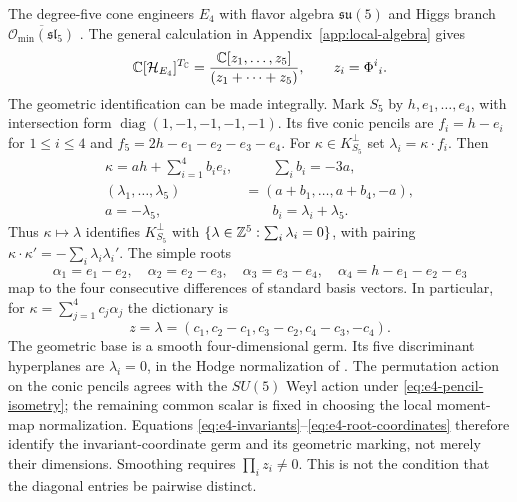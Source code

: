 The degree-five cone engineers $E_4$ with flavor algebra
$\mathfrak{su}(5)$ and Higgs branch
$\overline{\mathcal O_{\min}(\mathfrak{sl}_5)}$
\cite[Section~2.5]{Cremonesi:2015lsa}. The general calculation in
Appendix~\ref{app:local-algebra} gives
\begin{equation}
 \mathbb C[\mathcal H_{E_4}]^{T_{\mathbb C}}
 =\frac{\mathbb C[z_1,\ldots,z_5]}{(z_1+\cdots+z_5)},\qquad z_i=\Phi^i{}_i.
 \label{eq:e4-invariants}
\end{equation}
The geometric identification can be made integrally. Mark $S_5$ by
$h,e_1,\ldots,e_4$, with intersection form $\operatorname{diag}(1,-1,-1,-1,-1)$.
Its five conic pencils are $f_i=h-e_i$ for $1\leq i\leq4$ and
$f_5=2h-e_1-e_2-e_3-e_4$. For $\kappa\in K_{S_5}^{\perp}$ set
$\lambda_i=\kappa\cdot f_i$. Then
\begin{equation}
 \begin{aligned}
 \kappa=a h+\sum_{i=1}^4b_i e_i,&\qquad \sum_i b_i=-3a,\\
 (\lambda_1,\ldots,\lambda_5)&=(a+b_1,\ldots,a+b_4,-a),\\
 a=-\lambda_5,&\qquad b_i=\lambda_i+\lambda_5.
 \end{aligned}
 \label{eq:e4-pencil-isometry}
\end{equation}
Thus $\kappa\mapsto\lambda$ identifies $K_{S_5}^{\perp}$ with
$\{\lambda\in\mathbb Z^5:\sum_i\lambda_i=0\}$, with pairing
$\kappa\cdot\kappa'=-\sum_i\lambda_i\lambda_i'$. The simple roots
\begin{equation}
 \alpha_1=e_1-e_2,\quad\alpha_2=e_2-e_3,\quad
 \alpha_3=e_3-e_4,\quad\alpha_4=h-e_1-e_2-e_3
 \label{eq:e4-simple-roots}
\end{equation}
map to the four consecutive differences of standard basis vectors.
In particular, for $\kappa=\sum_{j=1}^4c_j\alpha_j$ the dictionary is
\begin{equation}
 z=\lambda=(c_1,c_2-c_1,c_3-c_2,c_4-c_3,-c_4).
 \label{eq:e4-root-coordinates}
\end{equation}
The geometric base is a smooth four-dimensional germ. Its five
discriminant hyperplanes are $\lambda_i=0$, in the Hodge normalization
of \cite[Lemma~3.2]{Wuebben:2026smoothing}. The permutation action
on the conic pencils agrees with the $SU(5)$ Weyl action under
\eqref{eq:e4-pencil-isometry}; the remaining common scalar is fixed
in choosing the local moment-map normalization. Equations
\eqref{eq:e4-invariants}--\eqref{eq:e4-root-coordinates} therefore
identify the invariant-coordinate germ and its geometric marking,
not merely their dimensions. Smoothing requires $\prod_i z_i\ne0$.
This is not the condition that the diagonal entries be pairwise distinct.

